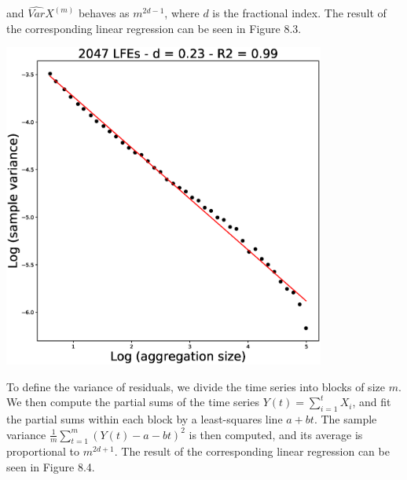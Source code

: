 \documentclass[workdone.tex]{subfiles}
\begin{document}
and $\hat{Var} X^{\left( m \right)}$ behaves as $m^{2 d - 1}$, where $d$ is the fractional index. The result of the corresponding linear regression can be seen in Figure 8.3.

\begin{center}
\includegraphics[width=300pt, trim={0cm 0cm 0cm 0cm},clip]{Figures/longrange/variance.eps}
\captionsetup{type=figure}
\end{center}

To define the variance of residuals, we divide the time series into blocks of size $m$. We then compute the partial sums of the time series $Y \left( t \right) = \sum_{i = 1}^{t} X_i$, and fit the partial sums within each block by a least-squares line $a + b t$. The sample variance $\frac{1}{m} \sum_{t = 1}^{m} \left( Y \left( t \right) - a - b t \right) ^2$ is then computed, and its average is proportional to $m^{2 d + 1}$. The result of the corresponding linear regression can be seen in Figure 8.4.
\end{document}
